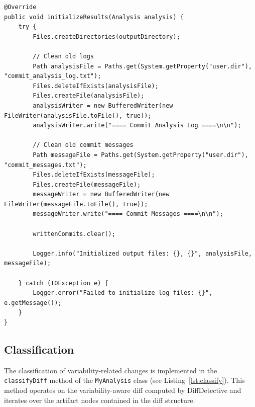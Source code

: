 \begin{lstlisting}[style=mypicturestyle, caption={Initialization of output files in \texttt{MyAnalysis.initializeResults}}, label={lst:init}]
@Override
public void initializeResults(Analysis analysis) {
    try {
        Files.createDirectories(outputDirectory);

        // Clean old logs
        Path analysisFile = Paths.get(System.getProperty("user.dir"), "commit_analysis_log.txt");
        Files.deleteIfExists(analysisFile);
        Files.createFile(analysisFile);
        analysisWriter = new BufferedWriter(new FileWriter(analysisFile.toFile(), true));
        analysisWriter.write("==== Commit Analysis Log ====\n\n");

        // Clean old commit messages
        Path messageFile = Paths.get(System.getProperty("user.dir"), "commit_messages.txt");
        Files.deleteIfExists(messageFile);
        Files.createFile(messageFile);
        messageWriter = new BufferedWriter(new FileWriter(messageFile.toFile(), true));
        messageWriter.write("==== Commit Messages ====\n\n");

        writtenCommits.clear();

        Logger.info("Initialized output files: {}, {}", analysisFile, messageFile);

    } catch (IOException e) {
        Logger.error("Failed to initialize log files: {}", e.getMessage());
    }
}
\end{lstlisting}

\subsection{Classification}

The classification of variability-related changes is implemented in the \texttt{classifyDiff} method of the \texttt{MyAnalysis} class (see Listing~\ref{lst:classify}). This method operates on the variability-aware diff computed by DiffDetective and iterates over the artifact nodes contained in the diff structure.


